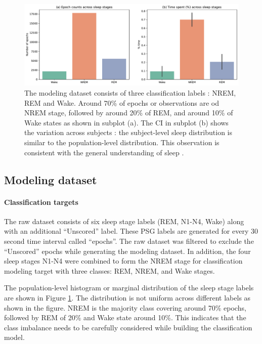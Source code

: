 \documentclass[12pt]{article}
\begin{document}
\begin{figure}
\centering
\includegraphics[width=\textwidth]{figures/histogram_sleep_counts.pdf}
\caption{The modeling dataset consists of three classification labels : NREM, REM and Wake. Around 70\% of epochs or observations are od NREM stage, followed by around 20\% of REM, and around 10\% of Wake states as shown in subplot (a). The CI in subplot (b) shows the variation across subjects : the subject-level sleep distribution is similar to the population-level distribution. This observation is consistent with the general understanding of sleep \citep{carskadon2005normal}.}
\label{fig:histogram_sleep_counts}
\end{figure}


\subsection{Modeling dataset}
\label{sec:modeling_dataset}
\paragraph{Classification targets} The raw dataset consists of six sleep stage labels (REM, N1-N4, Wake) along with an additional ``Unscored'' label. These PSG labels are generated for every 30 second time interval called ``epochs''. The raw dataset was filtered to exclude the ``Unscored'' epochs while generating the modeling dataset. In addition, the four sleep stages N1-N4 were combined to form the NREM stage for classification modeling target with three classes: REM, NREM, and Wake stages.



The population-level histogram or marginal distribution of the sleep stage labels are shown in Figure \ref{fig:histogram_sleep_counts}. The distribution is not uniform across different labels as shown in the figure. NREM is the majority class covering around 70\% epochs, followed by REM of 20\% and Wake state around 10\%. This indicates that the class imbalance needs to be carefully considered while building the classification model. 
\end{document}
